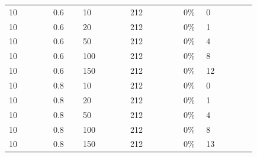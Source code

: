 \documentclass[12pt,a4paper,titlepage]{article}
\begin{document}
\begin{table}[H]
\begin{tabular}{|p{0.15\linewidth}|p{0.10\linewidth}|p{0.16\linewidth}|p{0.18\linewidth}|p{0.07\linewidth}|p{0.17\linewidth}|}
        \hline
        10 & 0.6 & 10 & 212 & 0\% & 0 \\
        10 & 0.6 & 20 & 212 & 0\% & 1 \\
        10 & 0.6 & 50 & 212 & 0\% & 4 \\
        10 & 0.6 & 100 & 212 & 0\% & 8 \\
        10 & 0.6 & 150 & 212 & 0\% & 12 \\
        \hline
        10 & 0.8 & 10 & 212 & 0\% & 0 \\
        10 & 0.8 & 20 & 212 & 0\% & 1 \\
        10 & 0.8 & 50 & 212 & 0\% & 4 \\
        10 & 0.8 & 100 & 212 & 0\% & 8 \\
        10 & 0.8 & 150 & 212 & 0\% & 13 \\
        \hline
    \end{tabular}
\end{table}
\end{document}
